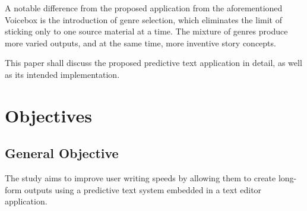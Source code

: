 \documentclass[journal]{./IEEE/IEEEtran}
\begin{document}
A notable difference from the proposed application from the aforementioned Voicebox is the introduction of genre selection, which eliminates the limit of sticking only to one source material at a time. The mixture of genres produce more varied outputs, and at the same time, more inventive story concepts. 

This paper shall discuss the proposed predictive text application in detail, as well as its intended implementation.

\section{Objectives}

\subsection{General Objective}
The study aims to improve user writing speeds by allowing them to create long-form outputs using a predictive text system embedded in a text editor application.
\end{document}
